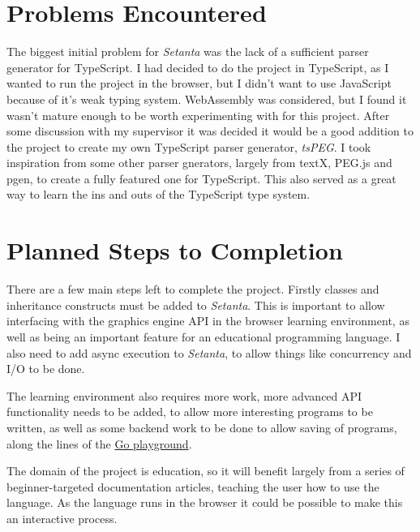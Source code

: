 \documentclass[11pt]{extarticle}
\newcommand{\Setanta}{\emph{Setanta}}
\newcommand{\tsPEG}{\emph{tsPEG}}
\begin{document}
    \section{Problems Encountered}

    The biggest initial problem for \Setanta{} was the lack of a sufficient parser generator for TypeScript. I had decided to do the project in TypeScript, as I wanted to run the project in the browser, but I didn't want to use JavaScript because of it's weak typing system. WebAssembly was considered, but I found it wasn't mature enough to be worth experimenting with for this project.
    After some discussion with my supervisor it was decided it would be a good addition to the project to create my own TypeScript parser generator, \tsPEG{}. I took inspiration from some other parser gnerators, largely from textX, PEG.js and pgen, to create a fully featured one for TypeScript. This also served as a great way to learn the ins and outs of the TypeScript type system.
    \section{Planned Steps to Completion}

    There are a few main steps left to complete the project. Firstly classes and inheritance constructs must be added to \Setanta{}. This is important to allow interfacing with the graphics engine API in the browser learning environment, as well as being an important feature for an educational programming language. I also need to add async execution to \Setanta{}, to allow things like concurrency and I/O to be done.

    The learning environment also requires more work, more advanced API functionality needs to be added, to allow more interesting programs to be written, as well as some backend work to be done to allow saving of programs, along the lines of the \href{https://play.golang.org}{Go playground}.

    The domain of the project is education, so it will benefit largely from a series of beginner-targeted documentation articles, teaching the user how to use the language. As the language runs in the browser it could be possible to make this an interactive process.
\end{document}
